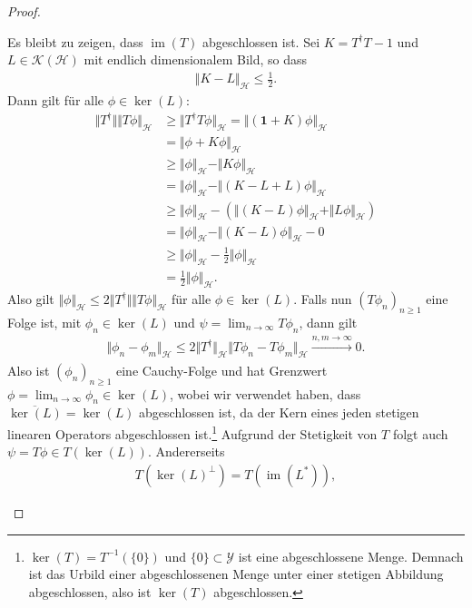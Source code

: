\documentclass[11pt, hidelinks]{article}
\newcommand{\h}{\mathcal{H}}
\newcommand{\im}{\operatorname{im}}
\numberwithin{conj}{section}
\begin{document}
\begin{proof}
\begin{itemize}
    Es bleibt zu zeigen, dass $\im(T)$ abgeschlossen ist. Sei $K = T^\dagger T - 1$ und $L \in \mathcal{K}(\h)$ mit endlich dimensionalem Bild, so dass
    \begin{align}
        \Vert K-L \Vert_\h \leq \frac{1}{2}.
    \end{align}
    Dann gilt für alle $\phi \in \ker(L)$:
    \begin{align}
        \Vert T^\dagger \Vert \Vert T\phi \Vert_\h &\geq \Vert T^\dagger T \phi \Vert_\h = \Vert (\mathbf{1}+K)\phi \Vert_\h \nonumber\\
        &= \Vert \phi + K\phi \Vert_\h \nonumber\\
        &\geq \Vert \phi \Vert_\h - \Vert K \phi \Vert_\h \nonumber\\
        &= \Vert \phi \Vert_\h - \Vert (K-L+L) \phi \Vert_\h \nonumber\\
        &\geq \Vert \phi \Vert_\h - (\Vert (K-L) \phi \Vert_\h + \Vert L \phi \Vert_\h) \nonumber\\
        &= \Vert \phi \Vert_\h - \Vert (K-L)\phi \Vert_\h - 0 \nonumber\\
        &\geq \Vert \phi \Vert_\h - \frac{1}{2} \Vert \phi \Vert_\h \nonumber\\
        &= \frac{1}{2} \Vert \phi \Vert_\h.
    \end{align}
    Also gilt $\Vert \phi \Vert_\h \leq 2 \Vert T^\dagger \Vert \Vert T\phi \Vert_\h$ für alle $\phi \in \ker(L)$. Falls nun $(T\phi_n)_{n \geq 1}$ eine Folge ist, mit $\phi_n \in \ker(L)$ und $\psi = \lim_{n \to \infty} T\phi_n$, dann gilt
    \begin{align}
        \Vert \phi_n - \phi_m \Vert_\h \leq 2 \Vert T^\dagger \Vert_\h \Vert T\phi_n - T\phi_m \Vert_\h \xrightarrow[]{n,m \to \infty} 0.
    \end{align}
    Also ist $(\phi_n)_{n \geq 1}$ eine Cauchy-Folge und hat Grenzwert $\phi = \lim_{n \to \infty} \phi_n \in \ker(L)$, wobei wir verwendet haben, dass $\overline{\ker(L)} = \ker(L)$ abgeschlossen ist, da der Kern eines jeden stetigen linearen Operators abgeschlossen ist.\footnote{$\ker(T) = T^{-1}(\{0\})$ und $\{0\} \subset \mathcal{Y}$ ist eine abgeschlossene Menge. Demnach ist das Urbild einer abgeschlossenen Menge unter einer stetigen Abbildung abgeschlossen, also ist $\ker(T)$ abgeschlossen.} Aufgrund der Stetigkeit von $T$ folgt auch $\psi = T\phi \in T(\ker(L))$. Andererseits
    \begin{align}
        T(\ker(L)^\perp) = T(\im(L^\ast)),
    \end{align}

\end{itemize}
\end{proof}
\end{document}
